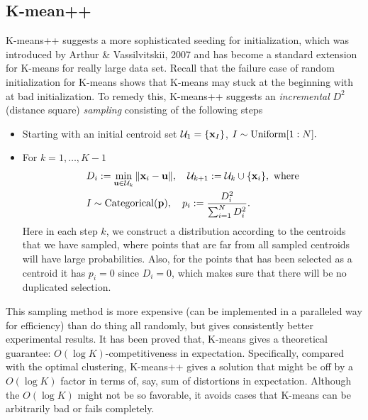 \documentclass[../book-template.tex]{subfiles}
\begin{document}
\subsection{K-mean++}
K-means++ suggests a more sophisticated seeding for initialization, which was introduced by Arthur \& Vassilvitskii, 2007 and has become a standard extension for K-means for really large data set. Recall that the failure case of random initialization for K-means shows that K-means may stuck at the beginning with at bad initialization. To remedy this, K-means++ suggests an \emph{incremental} $D^2$ (distance square) \emph{sampling} consisting of the following steps
\begin{itemize}
	\item Starting with an initial centroid set $\mathcal{U}_1=\{{\bf x}_I\}$, $I\sim {\rm Uniform}[1:N].$
	\item For $k=1,\dots,K-1$
	\begin{align*}
		&D_i:=\min_{{\bf u}\in \mathcal{U}_k}\|{\bf x}_i-{\bf u}\|,\quad \mathcal{U}_{k+1}:=\mathcal{U}_{k}\cup \{{\bf x}_i\},\ \text{where}\\
		&I\sim {\rm Categorical}({\bf p}),\quad p_i:=\frac{D_i^2}{\sum_{i=1}^{N}D_i^2}.
	\end{align*}
	Here in each step $k$, we construct a distribution according to the centroids that we have sampled, where points that are far from all sampled centroids will have large probabilities. Also, for the points that has been selected as a centroid it has $p_i=0$ since $D_i=0$, which makes sure that there will be no duplicated selection.
\end{itemize}
This sampling method is more expensive (can be implemented in a paralleled way for efficiency) than do thing all randomly, but gives consistently better experimental results. It has been proved that, K-means gives a theoretical guarantee: $O(\log K)$-competitiveness in expectation. Specifically, compared with the optimal clustering, K-means++ gives a solution that might be off by a $O(\log K)$ factor in terms of, say, sum of distortions in expectation. Although the $O(\log K)$ might not be so favorable, it avoids cases that K-means can be arbitrarily bad or fails completely.
\end{document}
